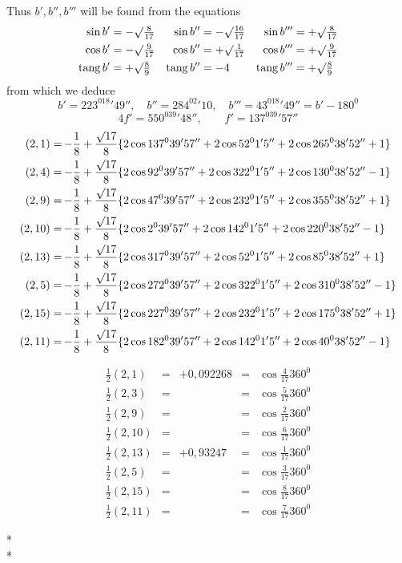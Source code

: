 Thus $b',b'',b'''$ will be found from the equations
\[
\begin{aligned}
\sin b'&=-\surd\tfrac8{17}&\sin b''&=-\surd\tfrac{16}{17}&\sin b'''&=+\surd\tfrac8{17}\\
\cos b'&=-\surd\tfrac9{17}&\cos b''&=+\surd\tfrac1{17}&\cos b'''&=+\surd\tfrac9{17}\\
\operatorname{tang}b'&=+\surd\tfrac89&\operatorname{tang}b''&=-4&\operatorname{tang}b'''&=+\surd\tfrac89
\end{aligned}
\]
from which we deduce
\[
b'=223^018'49'',\quad b''=284^02'10,\quad b'''=43^018'49''=b'-180^0
\]
\[
4f'=550^039'48'',\qquad f'=137^039'57''
\]
\[
\!\begin{aligned}
(2,1)&=\mkern-2mu-\frac18+\frac{\surd17}8\{2\cos137^039'57''+2\cos52^01'5''+2\cos265^038'52''+1\}\\
(2,4)&=\mkern-2mu-\frac18+\frac{\surd17}8\{2\cos92^039'57''+2\cos322^01'5''+2\cos130^038'52''-1\}\\
(2,9)&=\mkern-2mu-\frac18+\frac{\surd17}8\{2\cos47^039'57''+2\cos232^01'5''+2\cos355^038'52''+1\}\\
(2,10)&=\mkern-2mu-\frac18+\frac{\surd17}8\{2\cos2^039'57''+2\cos142^01'5''+2\cos220^038'52''-1\}\\
(2,13)&=\mkern-2mu-\frac18+\frac{\surd17}8\{2\cos317^039'57''+2\cos52^01'5''+2\cos85^038'52''+1\}\\
(2,5)&=\mkern-2mu-\frac18+\frac{\surd17}8\{2\cos272^039'57''+2\cos322^01'5''+2\cos310^038'52''-1\}\\
(2,15)&=\mkern-2mu-\frac18+\frac{\surd17}8\{2\cos227^039'57''+2\cos232^01'5''+2\cos175^038'52''+1\}\\
(2,11)&=\mkern-2mu-\frac18+\frac{\surd17}8\{2\cos182^039'57''+2\cos142^01'5''+2\cos40^038'52''-1\}
\end{aligned}
\]

\[
\begin{array}{rclcl}
\frac12(2,1)&=&+0{,}092268&=&\cos\frac4{17}360^0\\[3pt]
\frac12(2,3)&=&&=&\cos\frac5{17}360^0\\[3pt]
\frac12(2,9)&=&&=&\cos\frac2{17}360^0\\[3pt]
\frac12(2,10)&=&&=&\cos\frac6{17}360^0\\[3pt]
\frac12(2,13)&=&+0{,}93247&=&\cos\frac1{17}360^0\\[3pt]
\frac12(2,5)&=&&=&\cos\frac3{17}360^0\\[3pt]
\frac12(2,15)&=&&=&\cos\frac8{17}360^0\\[3pt]
\frac12(2,11)&=&&=&\cos\frac7{17}360^0
\end{array}
\]
\begin{center}*\qquad\qquad*\\*\end{center}

